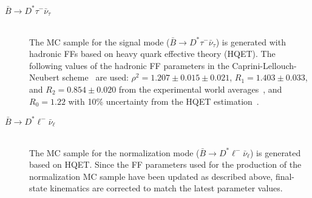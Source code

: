 \documentclass[aps,prd,twocolumn,superscriptaddress,showpacs,preprintnumbers,amsmath,amssymb]{revtex4-1}
\begin{document}
\begin{description}

\item[\textbf{\boldmath${\bar B} \rightarrow D^* \tau^- \bar{\nu}_\tau$}]\mbox{}\\
  The MC sample for the signal mode (${\bar B} \rightarrow D^* \tau^- \bar{\nu}_\tau$) is generated with hadronic FFs based on heavy quark effective theory (HQET). The following values of the hadronic FF parameters in the Caprini-Lellouch-Neubert scheme~\cite{cite:Caprini:1998, cite:CLN:note} are used: $\rho^2 = 1.207 \pm 0.015 \pm 0.021$, $R_1 = 1.403 \pm 0.033$, and $R_2 = 0.854 \pm 0.020$ from the experimental world averages~\cite{cite:HFLAV:2014}, and $R_0 = 1.22$ with 10\% uncertainty from the HQET estimation~\cite{cite:RDst:2012}.

\item[\textbf{\boldmath${\bar B} \rightarrow D^* \ell^- \bar{\nu}_\ell$}]\mbox{}\\
  The MC sample for the normalization mode ($\bar{B} \rightarrow D^* \ell^- \bar{\nu}_\ell$) is generated based on HQET. Since the FF parameters used for the production of the normalization MC sample have been updated as described above, final-state kinematics are corrected to match the latest parameter values.
  

\end{description}
\end{document}
